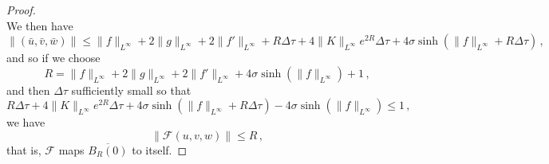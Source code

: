 \documentclass[10pt,a4paper]{amsart}
\newcommand{\cF}{\mathcal{F}}
\begin{document}
\begin{proof}
\begin{equation}
\end{equation}
We then have
\begin{equation}
\| (\bar{u},\bar{v},\bar{w}) \| \leq  \| f \|_{L^\infty} + 2\| g \|_{L^\infty} + 2\| f' \|_{L^\infty} + R \Delta \tau  + 4 \| K \|_{L^\infty} e^{2R} \Delta \tau + 4 \sigma \sinh \left( \| f \|_{L^\infty} + R \Delta \tau \right)  \, ,
\end{equation}
and so if we choose
\begin{equation} \label{sizeofR}
R =  \| f \|_{L^\infty} + 2\| g \|_{L^\infty} + 2\| f' \|_{L^\infty} + 4 \sigma \sinh \left( \| f \|_{L^\infty} \right) + 1 \, ,
\end{equation}
and then $\Delta \tau$ sufficiently small so that
\begin{equation} \label{sizeofdeltatau}
R \Delta \tau  + 4 \| K \|_{L^\infty} e^{2R} \Delta \tau + 4 \sigma \sinh \left( \| f \|_{L^\infty} + R \Delta \tau \right) - 4 \sigma \sinh \left( \| f \|_{L^\infty} \right) \leq 1 \, ,
\end{equation}
we have
\begin{equation}
\| \cF(u,v,w) \| \leq  R  \, ,
\end{equation}
that is, $\cF$ maps $\overline{B_R(0)}$ to itself.


\end{proof}
\end{document}
